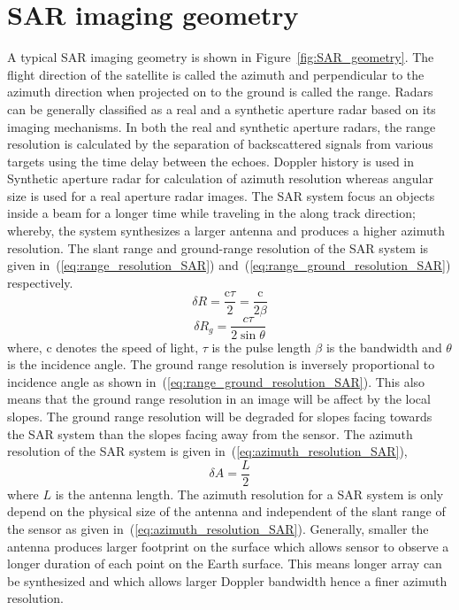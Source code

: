 \section{SAR imaging geometry}
A typical SAR imaging geometry is shown in Figure~\ref{fig:SAR_geometry}. The flight direction of the satellite is called the azimuth and perpendicular to the azimuth direction when projected on to the ground is called the range. Radars can be generally classified as a real and a synthetic aperture radar based on its imaging mechanisms. In both the real and synthetic aperture radars, the range resolution is calculated by the separation of backscattered signals from various targets using the time delay between the echoes.  Doppler history is used in Synthetic aperture radar for calculation of azimuth resolution whereas angular size is used for a real aperture radar images. The SAR system focus an objects inside a beam for a longer time while traveling in the along track direction; whereby, the system synthesizes a larger antenna and produces a higher azimuth resolution.
The slant range and ground-range resolution of the SAR system is given in~(\ref{eq:range_resolution_SAR}) and~(\ref{eq:range_ground_resolution_SAR}) respectively.  
\begin{equation}
\delta R= \frac{\mbox{c}\tau}{2}=\frac{\mbox{c}}{2\beta}
\label{eq:range_resolution_SAR}
\end{equation}
\begin{equation}
\delta R_g = \frac{c\tau}{2\sin\theta}
\label{eq:range_ground_resolution_SAR}
\end{equation}
where, $\mbox{c}$ denotes the speed of light, $\tau$ is the pulse length $\beta$ is the bandwidth and $\theta$ is the incidence angle. The ground range resolution is inversely proportional to incidence angle as shown in~(\ref{eq:range_ground_resolution_SAR}). This also means that the ground range resolution in an image will be affect by the local slopes. The ground range resolution will be degraded for slopes facing towards the SAR system than the slopes facing away from the sensor. The azimuth resolution of the SAR system is given in~(\ref{eq:azimuth_resolution_SAR}), 
\begin{equation}
\delta A = \frac{L}{2}
\label{eq:azimuth_resolution_SAR}
\end{equation}
where $L$ is the antenna length. The azimuth resolution for a SAR system is only depend on the physical size of the antenna and independent of the slant range of the sensor as given in~(\ref{eq:azimuth_resolution_SAR}). Generally, smaller the antenna produces larger footprint on the surface which allows sensor to observe a longer duration of each point on the Earth surface. This means longer array can be synthesized and which allows larger Doppler bandwidth hence a finer azimuth resolution.

